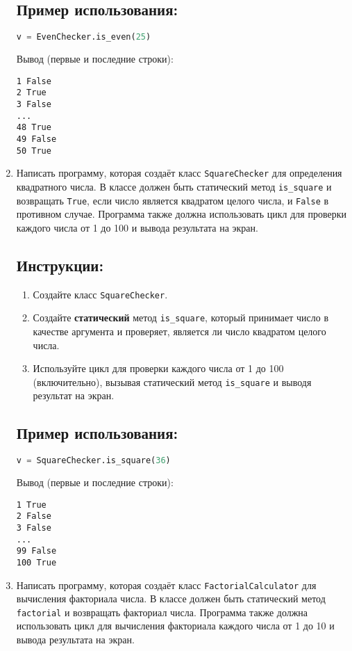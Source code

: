 \begin{enumerate}
\subsection*{Пример использования:}
\begin{lstlisting}[language=Python]
    v = EvenChecker.is_even(25)
\end{lstlisting}
Вывод (первые и последние строки):
\begin{verbatim}
1 False
2 True
3 False
...
48 True
49 False
50 True
\end{verbatim}

\item
Написать программу, которая создаёт класс \texttt{SquareChecker} 
для определения квадратного числа. В классе должен быть статический метод
\texttt{is\_square} и возвращать \texttt{True}, если число является квадратом целого числа, 
и \texttt{False} в противном случае. 
Программа также должна использовать цикл для проверки каждого числа от 
1 до 100 и вывода результата на экран.

\subsection*{Инструкции:}
\begin{enumerate}
    \item Создайте класс \texttt{SquareChecker}.
    \item Создайте \textbf{статический} метод \texttt{is\_square}, который принимает число в качестве аргумента и проверяет, является ли число квадратом целого числа.
    \item Используйте цикл для проверки каждого числа от 1 до 100 (включительно), вызывая статический метод \texttt{is\_square} и выводя результат на экран.
\end{enumerate}

\subsection*{Пример использования:}
\begin{lstlisting}[language=Python]
    v = SquareChecker.is_square(36)
\end{lstlisting}
Вывод (первые и последние строки):
\begin{verbatim}
1 True
2 False
3 False
...
99 False
100 True
\end{verbatim}

\item
Написать программу, которая создаёт класс \texttt{FactorialCalculator} 
для вычисления факториала числа. В классе должен быть статический метод
\texttt{factorial} и возвращать факториал числа. 
Программа также должна использовать цикл для вычисления факториала каждого числа от 
1 до 10 и вывода результата на экран.


\end{enumerate}
